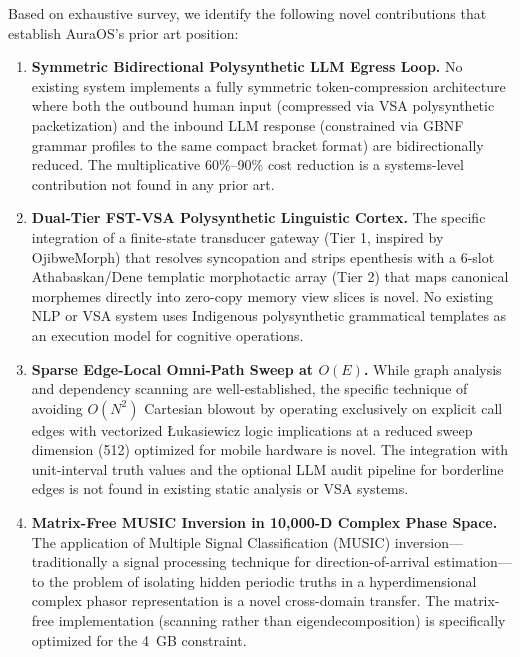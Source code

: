 \documentclass[11pt]{article}
\begin{document}
Based on exhaustive survey, we identify the following novel contributions that establish AuraOS's prior art position:

\begin{enumerate}[label=\textbf{N\arabic*}, leftmargin=*]

    \item \textbf{Symmetric Bidirectional Polysynthetic LLM Egress Loop.}
    No existing system implements a fully symmetric token-compression architecture where both the outbound human input (compressed via VSA polysynthetic packetization) and the inbound LLM response (constrained via GBNF grammar profiles to the same compact bracket format) are bidirectionally reduced. The multiplicative 60\%--90\% cost reduction is a systems-level contribution not found in any prior art.

    \item \textbf{Dual-Tier FST-VSA Polysynthetic Linguistic Cortex.}
    The specific integration of a finite-state transducer gateway (Tier 1, inspired by OjibweMorph) that resolves syncopation and strips epenthesis with a 6-slot Athabaskan/Dene templatic morphotactic array (Tier 2) that maps canonical morphemes directly into zero-copy memory view slices is novel. No existing NLP or VSA system uses Indigenous polysynthetic grammatical templates as an execution model for cognitive operations.

    \item \textbf{Sparse Edge-Local Omni-Path Sweep at $O(E)$.}
    While graph analysis and dependency scanning are well-established, the specific technique of avoiding $O(N^2)$ Cartesian blowout by operating exclusively on explicit call edges with vectorized Łukasiewicz logic implications at a reduced sweep dimension (512) optimized for mobile hardware is novel. The integration with unit-interval truth values and the optional LLM audit pipeline for borderline edges is not found in existing static analysis or VSA systems.

    \item \textbf{Matrix-Free MUSIC Inversion in 10,000-D Complex Phase Space.}
    The application of Multiple Signal Classification (MUSIC) inversion—traditionally a signal processing technique for direction-of-arrival estimation—to the problem of isolating hidden periodic truths in a hyperdimensional complex phasor representation is a novel cross-domain transfer. The matrix-free implementation (scanning rather than eigendecomposition) is specifically optimized for the 4~GB constraint.


\end{enumerate}
\end{document}

